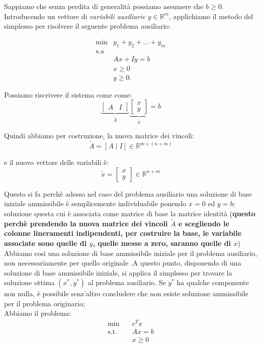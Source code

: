 Sappiamo che senza perdita di generalità possiamo assumere che $b \ge 0$. Introducendo un vettore di \textit{variabili ausiliarie} $y \in \mathbb{R}^m$, applichiamo il metodo del simplesso per risolvere il seguente problema ausiliario:

\[
\begin{array}{ll}
\min & y_1 + y_2 + \dots + y_m \\
\text{s.a} & \\
& Ax + Iy = b \\
& x \ge 0 \\
& y \ge 0.
\end{array}
\]

Possiamo riscrivere il sistema come come:
\[
\underbrace{
\begin{bmatrix}
A&I
\end{bmatrix}
}_{\widetilde A}
\underbrace{
\begin{bmatrix}
x\\
y
\end{bmatrix}
}_{\widetilde x}
=b
\]

Quindi abbiamo per costruzione, la nuova matrice dei vincoli:
\[
\boxed{\widetilde A=[A\mid I]\in\mathbb{R}^{m\times(n+m)}}
\]

e il nuovo vettore delle variabili è:
\[
\boxed{
\widetilde x=
\begin{bmatrix}
x\\y
\end{bmatrix}
\in\mathbb{R}^{n+m}
}
\]

Questo si fa perchè adesso nel caso del problema ausiliario una soluzione di base iniziale ammissibile è semplicemente individuabile ponendo $x = 0$ ed $y = b$; soluzione questa cui è associata come matrice di base la matrice identità (\textbf{questo perchè prendendo la nuova matrice dei vincoli $\widetilde{A}$ e scegliendo le colonne lineramenti indipendenti, per costruire la base, le variabile associate sono quelle di $y$, quelle messe a zero, saranno quelle di $x$})
Abbiamo così una soluzione di base ammissibile iniziale per il problema ausiliario, non necessariamente per quello originale
.A questo punto, disponendo di una soluzione di base ammissibile iniziale, si applica il simplesso per trovare la soluzione ottima $(x^*, y^*)$ al problema ausiliario. Se $y^*$ ha qualche componente non nulla, è possibile senz'altro concludere che non esiste soluzione ammissibile per il problema originario;
\\
Abbiamo il problema:
\[
\begin{aligned}
\min \quad & c^Tx\\
\text{s.t.}\quad & Ax=b\\
&x\geq 0
\end{aligned}
\]

